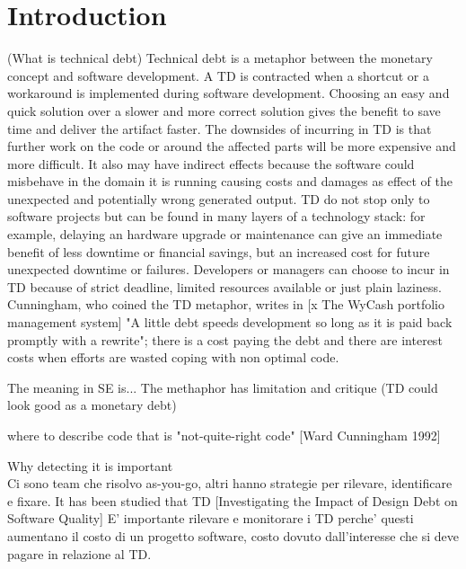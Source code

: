 \chapter{Introduction}
(What is technical debt) Technical debt is a metaphor between the monetary concept and software development.
A TD is contracted when a shortcut or a workaround is implemented during software development.
Choosing an easy and quick solution over a slower and more correct solution gives the benefit to save time and deliver the artifact faster. 
The downsides of incurring in TD is that further work on the code or around the affected parts will be more expensive and more difficult. It also may have indirect effects because the software could misbehave in the domain it is running causing costs and damages as effect of the unexpected and potentially wrong generated output.
TD do not stop only to software projects but can be found in many layers of a technology stack: for example, delaying an hardware upgrade or maintenance can give an immediate benefit of less downtime or financial savings, but an increased cost for future unexpected downtime or failures.
Developers or managers can choose to incur in TD because of strict deadline, limited resources available or just plain laziness.
Cunningham, who coined the TD metaphor, writes in [x The WyCash portfolio management system] "A little debt speeds development so long as it is paid back promptly with a rewrite"; there is a cost paying the debt and there are interest costs when efforts are wasted coping with non optimal code.


The meaning in SE is...
The methaphor has limitation and critique (TD could look good as a monetary debt)


where  to describe code that is "not-quite-right code" [Ward Cunningham 1992] 


Why detecting it is important\\
Ci sono team che risolvo as-you-go, altri hanno strategie per rilevare, identificare e fixare.
It has been studied that TD [Investigating the Impact of Design Debt on Software Quality]
E' importante rilevare e monitorare i TD perche' questi aumentano il costo di un progetto software, costo dovuto dall'interesse che si deve pagare in relazione al TD.

\newpage




